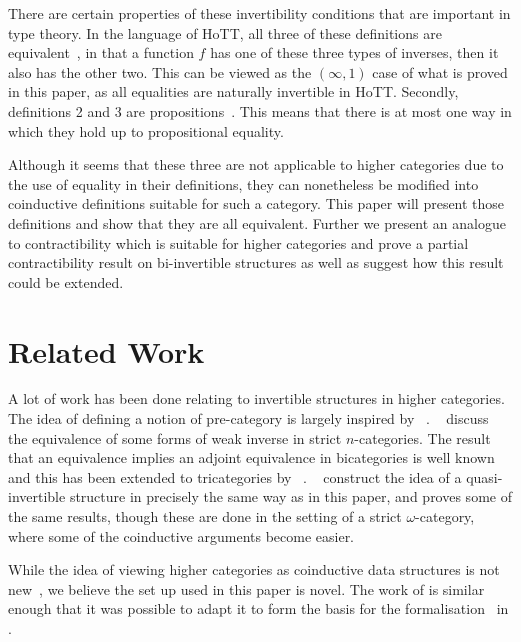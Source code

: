\documentclass[draft]{article}
\begin{document}
There are certain properties of these invertibility conditions that
are important in type theory. In the language of HoTT, all three of
these definitions are equivalent~\cite[Corollary 4.3.3]{hottbook}, in
that a function \(f\) has one of these three types of inverses, then
it also has the other two. This can be viewed as the \((\infty,1)\)
case of what is proved in this paper, as all equalities are naturally
invertible in HoTT. Secondly, definitions 2 and 3 are
propositions~\cite[Theorem 4.2.13, Theorem 4.3.2]{hottbook}. This
means that there is at most one way in which they hold up to
propositional equality.

Although it seems that these three are not applicable to higher
categories due to the use of equality in their definitions, they can
nonetheless be modified into coinductive definitions suitable for such
a category. This paper will present those definitions and show that
they are all equivalent. Further we present an analogue to
contractibility which is suitable for higher categories and prove a
partial contractibility result on bi-invertible structures as well as
suggest how this result could be extended.

\section{Related Work}\label{sec:related}

A lot of work has been done relating to invertible structures in
higher categories. The idea of defining a notion of pre-category is
largely inspired by \citeauthor{Cheng2007}~\cite{Cheng2007}.
\citeauthor{kansangian2009weak}~\cite{kansangian2009weak} discuss the
equivalence of some forms of weak inverse in strict \(n\)-categories.
The result that an equivalence implies an adjoint equivalence in
bicategories is well known and this has been extended to tricategories
by
\citeauthor{gurski2012biequivalences}~\cite{gurski2012biequivalences}.
\citeauthor*{lafont2010folk}~\cite{lafont2010folk} construct the idea
of a quasi-invertible structure in precisely the same way as in this
paper, and proves some of the same results, though these are done in
the setting of a strict \(\omega\)-category, where some of the
coinductive arguments become easier.

While the idea of viewing higher categories as coinductive data
structures is not
new~\cite{cheng2012weak,hirschowitz_et_al:LIPIcs:2015:5166}, we
believe the set up used in this paper is novel. The work of
\citeauthor{hirschowitz_et_al:LIPIcs:2015:5166} is similar enough that
it was possible to adapt it to form the basis for the
formalisation~\cite{rice_agda} in .
\end{document}
